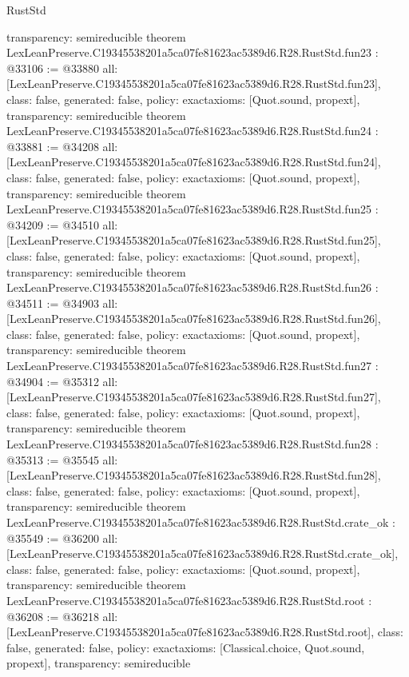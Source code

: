 \begin{lexlean}{RustStd}
\begin{coremodule}
{  transparency: semireducible
}
theorem LexLeanPreserve.C19345538201a5ca07fe81623ac5389d6.R28.RustStd.fun23 : @33106 := @33880 {
  all: [LexLeanPreserve.C19345538201a5ca07fe81623ac5389d6.R28.RustStd.fun23],
  class: false,
  generated: false,
  policy: exact{axioms: [Quot.sound, propext]},
  transparency: semireducible
}
theorem LexLeanPreserve.C19345538201a5ca07fe81623ac5389d6.R28.RustStd.fun24 : @33881 := @34208 {
  all: [LexLeanPreserve.C19345538201a5ca07fe81623ac5389d6.R28.RustStd.fun24],
  class: false,
  generated: false,
  policy: exact{axioms: [Quot.sound, propext]},
  transparency: semireducible
}
theorem LexLeanPreserve.C19345538201a5ca07fe81623ac5389d6.R28.RustStd.fun25 : @34209 := @34510 {
  all: [LexLeanPreserve.C19345538201a5ca07fe81623ac5389d6.R28.RustStd.fun25],
  class: false,
  generated: false,
  policy: exact{axioms: [Quot.sound, propext]},
  transparency: semireducible
}
theorem LexLeanPreserve.C19345538201a5ca07fe81623ac5389d6.R28.RustStd.fun26 : @34511 := @34903 {
  all: [LexLeanPreserve.C19345538201a5ca07fe81623ac5389d6.R28.RustStd.fun26],
  class: false,
  generated: false,
  policy: exact{axioms: [Quot.sound, propext]},
  transparency: semireducible
}
theorem LexLeanPreserve.C19345538201a5ca07fe81623ac5389d6.R28.RustStd.fun27 : @34904 := @35312 {
  all: [LexLeanPreserve.C19345538201a5ca07fe81623ac5389d6.R28.RustStd.fun27],
  class: false,
  generated: false,
  policy: exact{axioms: [Quot.sound, propext]},
  transparency: semireducible
}
theorem LexLeanPreserve.C19345538201a5ca07fe81623ac5389d6.R28.RustStd.fun28 : @35313 := @35545 {
  all: [LexLeanPreserve.C19345538201a5ca07fe81623ac5389d6.R28.RustStd.fun28],
  class: false,
  generated: false,
  policy: exact{axioms: [Quot.sound, propext]},
  transparency: semireducible
}
theorem LexLeanPreserve.C19345538201a5ca07fe81623ac5389d6.R28.RustStd.crate_ok : @35549 := @36200 {
  all: [LexLeanPreserve.C19345538201a5ca07fe81623ac5389d6.R28.RustStd.crate_ok],
  class: false,
  generated: false,
  policy: exact{axioms: [Quot.sound, propext]},
  transparency: semireducible
}
theorem LexLeanPreserve.C19345538201a5ca07fe81623ac5389d6.R28.RustStd.root : @36208 := @36218 {
  all: [LexLeanPreserve.C19345538201a5ca07fe81623ac5389d6.R28.RustStd.root],
  class: false,
  generated: false,
  policy: exact{axioms: [Classical.choice, Quot.sound, propext]},
  transparency: semireducible
}


\end{coremodule}
\end{lexlean}
